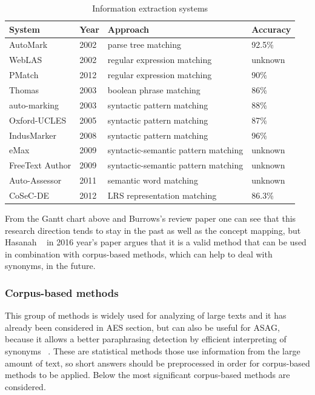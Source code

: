 \documentclass[11pt]{report}
\numberwithin{equation}{section} %
\begin{document}
\begin{table}[h!]
\centering
\caption{Information extraction systems}
\label{IE}
\begin{tabular}{|l|l|l|l|}
\hline
 System & Year & Approach & Accuracy \\ \hline
 AutoMark & 2002  & parse tree matching & 92.5\% \\ \hline
 WebLAS & 2002  & regular expression matching  & unknown \\ \hline
 PMatch & 2012  & regular expression matching & 90\%  \\ \hline
 Thomas & 2003  & boolean phrase matching & 86\% \\ \hline
 auto-marking & 2003  & syntactic pattern matching &  88\% \\ \hline
 Oxford-UCLES & 2005  & syntactic pattern matching &  87\% \\ \hline
 IndusMarker & 2008  & syntactic pattern matching & 96\% \\ \hline
 eMax & 2009  & syntactic-semantic pattern matching &  unknown \\ \hline
 FreeText Author & 2009  & syntactic-semantic pattern matching &  unknown \\ \hline
 Auto-Assessor & 2011  & semantic word matching  &  unknown \\ \hline
 CoSeC-DE & 2012 & LRS representation matching &  86.3\% \\ \hline
\end{tabular}
\end{table}

From the Gantt chart above and Burrows's review paper one can see that this research direction tends to stay in the past as well as the concept mapping, but Hasanah ~\cite{Hasanah} in 2016 year's paper argues that it is a valid method that can be used in combination with corpus-based methods, which can help to deal with synonyms, in the future.

\subsubsection{Corpus-based methods}

This group of methods is widely used for analyzing of large texts and it has already been considered in AES section, but can also be useful for ASAG, because it allows a better paraphrasing detection by efficient interpreting of synonyms ~\cite{Burrows}. These are statistical methods those use information from the large amount of text, so short answers should be preprocessed in order for corpus-based methods to be applied. Below the most significant corpus-based methods are considered.\\
\end{document}
